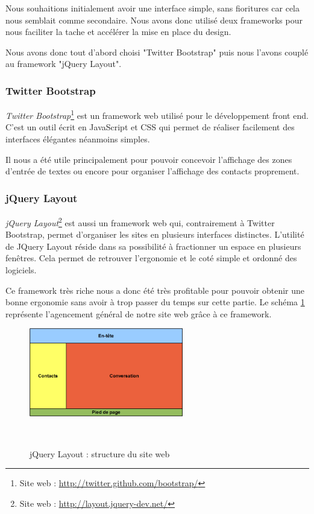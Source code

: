 Nous souhaitions initialement avoir une interface simple, sans fioritures car cela nous semblait comme
secondaire. Nous avons donc utilisé deux frameworks pour nous faciliter la tache et accélérer la mise
en place du design.

Nous avons donc tout d'abord choisi "Twitter Bootstrap" puis nous l'avons couplé au framework "jQuery
Layout".
\\


\subsubsection{Twitter Bootstrap}

\textit{Twitter Bootstrap}\footnote{Site web : \href{http://twitter.github.com/bootstrap/}{http://twitter.github.com/bootstrap/}} est un framework web utilisé pour le développement front end.
C'est un outil écrit en JavaScript et CSS qui permet de réaliser facilement des interfaces élégantes néanmoins simples. 

Il nous a été utile principalement pour pouvoir concevoir l'affichage des zones d'entrée de textes ou 
encore pour organiser l'affichage des contacts proprement.
\\


\subsubsection{jQuery Layout}

\textit{jQuery Layout}\footnote{Site web : \href{http://layout.jquery-dev.net/}{http://layout.jquery-dev.net/}} est aussi un framework web qui, contrairement à Twitter Bootstrap, permet d'organiser les sites en plusieurs interfaces distinctes. 
L'utilité de JQuery Layout réside dans sa possibilité à fractionner un espace en plusieurs fenêtres.
Cela permet de retrouver l'ergonomie et le coté simple et ordonné des logiciels. 

Ce framework très riche nous a donc été très profitable pour pouvoir obtenir une bonne ergonomie sans avoir
à trop passer du temps sur cette partie.
Le schéma \ref{siteWeb_jQueryLayout} représente l'agencement général de notre site web grâce à ce framework.

\begin{figure}[!h]
	\center
	\includegraphics[width=0.6\textwidth]{img/siteWeb_jQueryLayout.png}
	\caption{jQuery Layout : structure du site web}
	\label{siteWeb_jQueryLayout}
~~\\
\end{figure}
